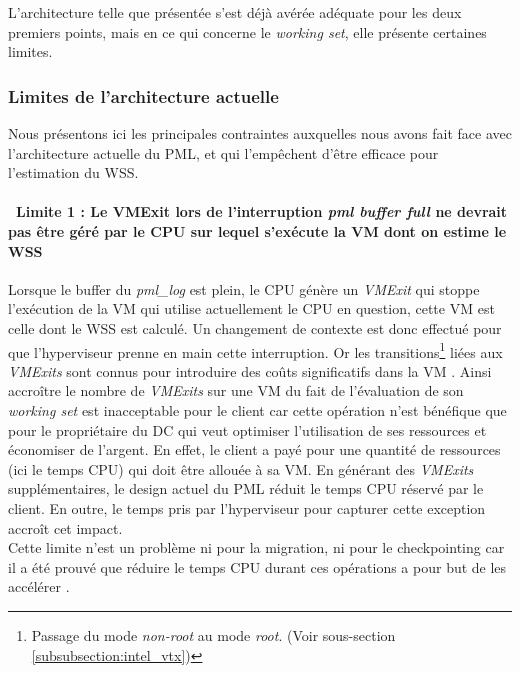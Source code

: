 \noindent L'architecture telle que présentée s'est déjà avérée adéquate pour les deux premiers points, mais en ce qui concerne le \textit{working set}, elle présente certaines limites.

\subsubsection{Limites de l'architecture actuelle}
\label{subsubsection:limites_pml_actuel}
Nous présentons ici les principales contraintes auxquelles nous avons fait face avec l'architecture actuelle du PML, et qui l'empêchent d'être efficace pour l'estimation du WSS.

\paragraph{\textbullet\ \textbf{Limite 1 : Le VMExit lors de l'interruption \textit{pml buffer full} ne devrait pas être géré par le CPU sur lequel s'exécute la VM dont on estime le WSS}}
\par\noindent
\par\noindent Lorsque le buffer du \textit{pml\_log} est plein, le CPU génère un \textit{VMExit} qui stoppe l'exécution de la VM qui utilise actuellement le CPU en question, cette VM est celle dont le WSS est calculé. Un changement de contexte est donc effectué pour que l'hyperviseur prenne en main cette interruption. Or les transitions\footnote{Passage du mode \textit{non-root} au mode \textit{root}. (Voir sous-section \ref{subsubsection:intel_vtx})} liées aux \textit{VMExits} sont connus pour introduire des coûts significatifs dans la VM \cite{vmexit}. Ainsi accroître le nombre de \textit{VMExits} sur une VM du fait de l'évaluation de son \textit{working set} est \break inacceptable pour le client car cette opération n'est bénéfique que pour le propriétaire du DC qui veut optimiser l'utilisation de ses ressources et économiser de l'argent. En effet, le client a payé pour une quantité de ressources (ici le temps CPU) qui doit être allouée à sa VM. En générant des \textit{VMExits} supplémentaires, le design actuel du PML réduit le temps CPU réservé par le client. En outre, le temps pris par l'hyperviseur pour capturer cette exception accroît cet impact.\\
Cette limite n'est un problème ni pour la migration, ni pour le checkpointing car il a été prouvé que réduire le temps CPU durant ces opérations a pour but de les accélérer \cite{cpu_live_miration}.

